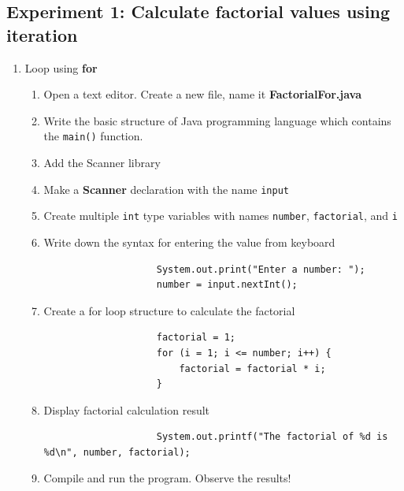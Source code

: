 \documentclass[12pt,titlepage]{article}
\begin{document}
\subsection{Experiment 1: Calculate factorial values using iteration}
\begin{enumerate}[label=\alph*)]
    \item {
        Loop using \textbf{for}

        \begin{enumerate}[label=\arabic*.]
            \item Open a text editor. Create a new file, name it \textbf{FactorialFor.java}
            \item Write the basic structure of Java programming language which contains the \texttt{main()} function.
            \item Add the Scanner library
            \item Make a \textbf{Scanner} declaration with the name \texttt{input}
            \item Create multiple \texttt{int} type variables with names \texttt{number}, \texttt{factorial}, and \texttt{i}
            \item {
                Write down the syntax for entering the value from keyboard

                \begin{verbatim}
                    System.out.print("Enter a number: ");
                    number = input.nextInt();
                \end{verbatim}
            }
            \pagebreak
            \item {
                Create a for loop structure to calculate the factorial

                \begin{verbatim}
                    factorial = 1;
                    for (i = 1; i <= number; i++) {
                        factorial = factorial * i;
                    }
                \end{verbatim}
            }
            \item {
                Display factorial calculation result

                \begin{verbatim}
                    System.out.printf("The factorial of %d is %d\n", number, factorial);
                \end{verbatim}
            }
            \item {
                Compile and run the program. Observe the results!

}
\end{enumerate}}
\end{enumerate}
\end{document}
